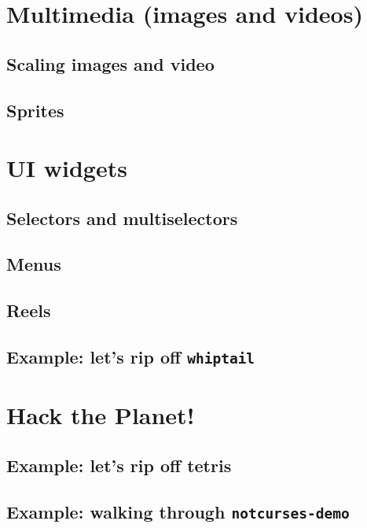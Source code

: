 \documentclass[letterpaper,10pt]{article}
\begin{document}
\section{Multimedia (images and videos)}
\subsection{Scaling images and video}
\subsection{Sprites}

\section{UI widgets}
\label{section:uiwidgets}
\subsection{Selectors and multiselectors}
\subsection{Menus}
\subsection{Reels}
\subsection{Example: let's rip off \texttt{whiptail}}

\section{Hack the Planet!}
\subsection{Example: let's rip off tetris}
\label{section:casestudy}
\subsection{Example: walking through \texttt{notcurses-demo}}

\newpage
\end{document}
